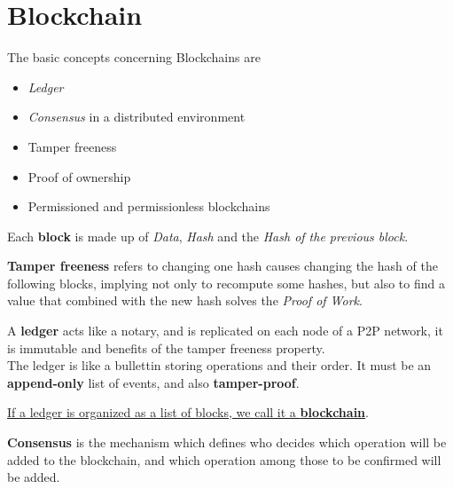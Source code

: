 \chapter{Blockchain}
The basic concepts concerning Blockchains are
\begin{itemize}
   \item \textit{Ledger}
   \item \textit{Consensus} in a distributed environment
   \item Tamper freeness
   \item Proof of ownership
   \item Permissioned and permissionless blockchains
\end{itemize}

Each \textbf{block} is made up of \textit{Data}, \textit{Hash} and the \textit{Hash of the previous block}.

\textbf{Tamper freeness} refers to changing one hash causes changing the hash of the following blocks, implying not only to recompute some hashes, but also to find a value that combined with the new hash solves the \textit{Proof of Work}.

A \textbf{ledger} acts like a notary, and is replicated on each node of a P2P network, it is immutable and benefits of the tamper freeness property.\\
The ledger is like a bullettin storing operations and their order. It must be an \textbf{append-only} list of events, and also \textbf{tamper-proof}.

\begin{center}
   \ul{If a ledger is organized as a list of blocks, we call it a \textbf{blockchain}}.
\end{center}
\nl

\textbf{Consensus} is the mechanism which defines who decides which operation will be added to the blockchain, and which operation among those to be confirmed will be added.

